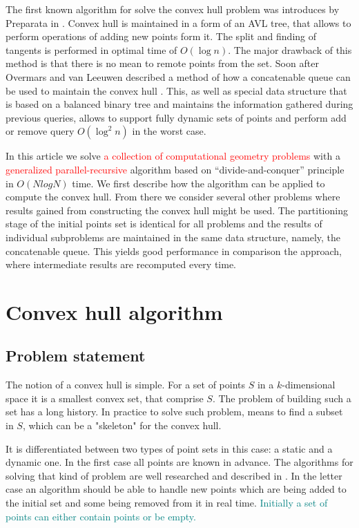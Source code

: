 \documentclass[conference]{IEEEtran}
\theoremstyle{plane}
\begin{document}
The first known algorithm for solve the convex hull problem was introduces by Preparata in \cite{preparata}. Convex hull is maintained in a form of an AVL tree, that allows to perform operations of adding new points form it. The split and finding of tangents is performed in optimal time of $O(\log n)$. The major drawback of this method is that there is no mean to remote points from the set. Soon after Overmars and van Leeuwen described a method of how a concatenable queue can be used to maintain the convex hull \cite{overmars}. This, as well as special data structure that is based on a balanced binary tree and maintains the information gathered during previous queries, allows to support fully dynamic sets of points and perform add or remove query  $O(\log^2 n)$ in the worst case.

In this article we solve \textcolor{red}{a collection of computational geometry problems} with a \textcolor{red}{generalized parallel-recursive} algorithm based on ``divide-and-conquer'' principle in $O(NlogN)$ time. We first describe how the algorithm can be applied to compute the convex hull. From there we consider several other problems where results gained from constructing the convex hull might be used. The partitioning stage of the initial points set is identical for all problems and the results of individual subproblems are maintained in the same data structure, namely, the concatenable queue. This yields good performance in comparison the approach, where intermediate results are recomputed every time.


\section{Convex hull algorithm}
\subsection{Problem statement}

The notion of a convex hull is simple. For a set of points $S$ in a $k$-dimensional space it is a smallest convex set, that comprise $S$. The problem of building such a set has a long history. In practice to solve such problem, means to find a subset in $S$, which can be a "skeleton" for the convex hull.

It is differentiated between two types of point sets in this case: a static and a dynamic one. In the first case all points are known in advance. The algorithms for solving that kind of problem are well researched and described in \cite{jarvis, graham, quickhull}. In the letter case an algorithm should be able to handle new points which are being added to the initial set and some  being removed from it in real time. \textcolor{teal}{Initially a set of points can either contain points or be empty.}
\end{document}
